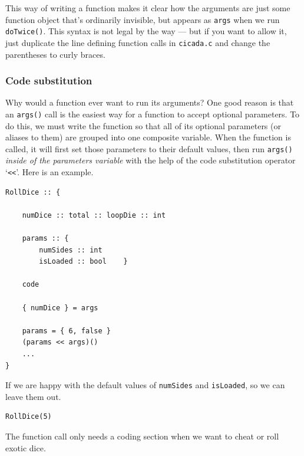 \documentclass{article}
\newenvironment{code}{
       \begin{list}{}{
               \setlength{\leftmargin}{.4in}
               \setlength{\rightmargin}{0in}
               \setlength{\topsep}{.2in}
       }
       \small
       \item[] }
       { \end{list}   }
\begin{document}
\noindent This way of writing a function makes it clear how the arguments are just some function object that's ordinarily invisible, but appears as \verb#args# when we run \verb#doTwice()#.  This syntax is not legal by the way --- but if you want to allow it, just duplicate the line defining function calls in \verb#cicada.c# and change the parentheses to curly braces.

 





\subsubsection{Code substitution}

Why would a function ever want to run its arguments?  One good reason is that an \verb#args()# call is the easiest way for a function to accept optional parameters.  To do this, we must write the function so that all of its optional parameters (or aliases to them) are grouped into one composite variable.  When the function is called, it will first set those parameters to their default values, then run \verb#args()# \emph{inside of the parameters variable} with the help of the code substitution operator `\verb#<<#'.  Here is an example.

\begin{code} \begin{verbatim}
RollDice :: {
    
    numDice :: total :: loopDie :: int
    
    params :: {
        numSides :: int
        isLoaded :: bool    }
    
    code
    
    { numDice } = args
    
    params = { 6, false }
    (params << args)()
    ...
}
\end{verbatim} \end{code}

\noindent If we are happy with the default values of \verb#numSides# and \verb#isLoaded#, so we can leave them out.

\begin{code} \begin{verbatim}
RollDice(5)
\end{verbatim} \end{code}

\noindent The function call only needs a coding section when we want to cheat or roll exotic dice.
\end{document}
